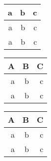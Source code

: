 \documentclass{article}
\begin{document}
\begin{tabular}{|r|r|r|}
\hline
a&b&c\\ \hline
a&b&c\\ \hline
a&b&c\\ \hline
\end{tabular}
\begin{tabular}{|r|r|r|}
\hline
A&B&C\\ \hline \hline
a&b&c\\ \hline
a&b&c\\ \hline
\end{tabular}
\begin{longtable}{|r|r|r|}
\hline
A&B&C\\ \hline \hline
a&b&c\\ \hline
a&b&c\\ \hline
\end{longtable}
\end{document}
